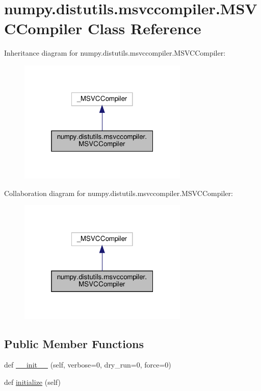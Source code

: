 \hypertarget{classnumpy_1_1distutils_1_1msvccompiler_1_1MSVCCompiler}{}\section{numpy.\+distutils.\+msvccompiler.\+M\+S\+V\+C\+Compiler Class Reference}
\label{classnumpy_1_1distutils_1_1msvccompiler_1_1MSVCCompiler}


Inheritance diagram for numpy.\+distutils.\+msvccompiler.\+M\+S\+V\+C\+Compiler\+:
\nopagebreak
\begin{figure}[H]
\begin{center}
\leavevmode
\includegraphics[width=229pt]{classnumpy_1_1distutils_1_1msvccompiler_1_1MSVCCompiler__inherit__graph}
\end{center}
\end{figure}


Collaboration diagram for numpy.\+distutils.\+msvccompiler.\+M\+S\+V\+C\+Compiler\+:
\nopagebreak
\begin{figure}[H]
\begin{center}
\leavevmode
\includegraphics[width=229pt]{classnumpy_1_1distutils_1_1msvccompiler_1_1MSVCCompiler__coll__graph}
\end{center}
\end{figure}
\subsection*{Public Member Functions}
\begin{DoxyCompactItemize}
\item 
def \hyperlink{classnumpy_1_1distutils_1_1msvccompiler_1_1MSVCCompiler_a84a0fc3d7d7192086f02760f7d453af1}{\+\_\+\+\_\+init\+\_\+\+\_\+} (self, verbose=0, dry\+\_\+run=0, force=0)
\item 
def \hyperlink{classnumpy_1_1distutils_1_1msvccompiler_1_1MSVCCompiler_a1e4a17ed626afe7ae2ec864af10c4620}{initialize} (self)
\end{DoxyCompactItemize}



